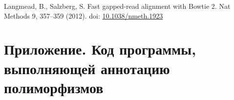 \documentclass[a4paper,12pt]{article}
\begin{document}
\begin{thebibliography}{99}
     Langmead, B., Salzberg, S. Fast gapped-read alignment with Bowtie 2. Nat Methods 9, 357–359 (2012). doi: \href{https://doi.org/10.1038/nmeth.1923}{10.1038/nmeth.1923}
\end{thebibliography}

\section{Приложение. Код программы, выполняющей аннотацию полиморфизмов}


\end{document}
